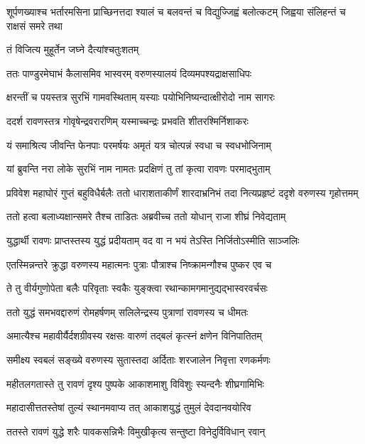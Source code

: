 \threelineshloka
{शूर्पणख्याश्च भर्तारमसिना प्राच्छिनत्तदा}
{श्यालं च बलवन्तं च विद्युज्जिह्वं बलोत्कटम्}
{जिह्वया संलिहन्तं च राक्षसं समरे तथा} %

\onelineshloka
{तं विजित्य मुहूर्तेन जघ्ने दैत्यांश्चतुःशतम्} %

\twolineshloka
{ततः पाण्डुरमेघाभं कैलासमिव भास्वरम्}
{वरुणस्यालयं दिव्यमपश्यद्राक्षसाधिपः} %

\twolineshloka
{क्षरन्तीं च पयस्तत्र सुरभिं गामवस्थिताम्}
{यस्याः पयोभिनिष्यन्दात्क्षीरोदो नाम सागरः} %

\twolineshloka
{ददर्श रावणस्तत्र गोवृषेन्द्रवरारणिम्}
{यस्माच्चन्द्रः प्रभवति शीतरश्मिर्निशाकरः} %

\twolineshloka
{यं समाश्रित्य जीवन्ति फेनपाः परमर्षयः}
{अमृतं यत्र चोत्पन्नं स्वधा च स्वधभोजिनाम्} %

\twolineshloka
{यां ब्रुवन्ति नरा लोके सुरभिं नाम नामतः}
{प्रदक्षिणं तु तां कृत्वा रावणः परमाद्भुताम्} %

\threelineshloka
{प्रविवेश महाघोरं गुप्तं बहुविधैर्बलैः}
{ततो धाराशताकीर्णं शारदाभ्रनिभं तदा}
{नित्यप्रहृष्टं ददृशे वरुणस्य गृहोत्तमम्} %

\twolineshloka
{ततो हत्वा बलाध्यक्षान्समरे तैश्च ताडितः}
{अब्रवीच्च ततो योधान् राजा शीघ्रं निवेद्यताम्} %

\twolineshloka
{युद्धार्थी रावणः प्राप्तस्तस्य युद्धं प्रदीयताम्}
{वद वा न भयं तेऽस्ति निर्जितोऽस्मीति साञ्जलिः} %

\twolineshloka
{एतस्मिन्नन्तरे क्रुद्धा वरुणस्य महात्मनः}
{पुत्राः पौत्राश्च निष्क्रामन्गौश्च पुष्कर एव च} %

\twolineshloka
{ते तु वीर्यगुणोपेता बलैः परिवृताः स्वकैः}
{युङ्क्त्वा रथान्कामगमानुद्यद्भास्वरवर्चसः} %

\twolineshloka
{ततो युद्धं समभवद्दारुणं रोमहर्षणम्}
{सलिलेन्द्रस्य पुत्राणां रावणस्य च धीमतः} %

\twolineshloka
{अमात्यैश्च महावीर्यैर्दशग्रीवस्य रक्षसः}
{वारुणं तद्बलं कृत्स्नं क्षणेन विनिपातितम्} %

\twolineshloka
{समीक्ष्य स्वबलं सङ्ख्ये वरुणस्य सुतास्तदा}
{अर्दिताः शरजालेन निवृत्ता रणकर्मणः} %

\twolineshloka
{महीतलगतास्ते तु रावणं दृश्य पुष्पके}
{आकाशमाशु विविशुः स्यन्दनैः शीघ्रगामिभिः} %

\twolineshloka
{महादासीत्ततस्तेषां तुल्यं स्थानमवाप्य तत्}
{आकाशयुद्धं तुमुलं देवदानवयोरिव} %

\twolineshloka
{ततस्ते रावणं युद्धे शरैः पावकसन्निभैः}
{विमुखीकृत्य सन्तुष्टा विनेदुर्विविधान् रवान्} %

